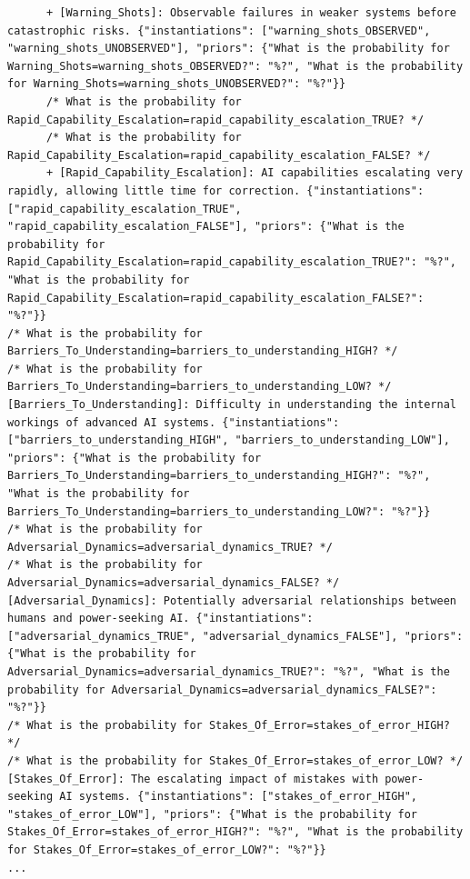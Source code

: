 \documentclass[
  11pt,
  letterpaper,
]{book}
\begin{document}
\begin{verbatim}
      + [Warning_Shots]: Observable failures in weaker systems before catastrophic risks. {"instantiations": ["warning_shots_OBSERVED", "warning_shots_UNOBSERVED"], "priors": {"What is the probability for Warning_Shots=warning_shots_OBSERVED?": "%?", "What is the probability for Warning_Shots=warning_shots_UNOBSERVED?": "%?"}}
      /* What is the probability for Rapid_Capability_Escalation=rapid_capability_escalation_TRUE? */
      /* What is the probability for Rapid_Capability_Escalation=rapid_capability_escalation_FALSE? */
      + [Rapid_Capability_Escalation]: AI capabilities escalating very rapidly, allowing little time for correction. {"instantiations": ["rapid_capability_escalation_TRUE", "rapid_capability_escalation_FALSE"], "priors": {"What is the probability for Rapid_Capability_Escalation=rapid_capability_escalation_TRUE?": "%?", "What is the probability for Rapid_Capability_Escalation=rapid_capability_escalation_FALSE?": "%?"}}
/* What is the probability for Barriers_To_Understanding=barriers_to_understanding_HIGH? */
/* What is the probability for Barriers_To_Understanding=barriers_to_understanding_LOW? */
[Barriers_To_Understanding]: Difficulty in understanding the internal workings of advanced AI systems. {"instantiations": ["barriers_to_understanding_HIGH", "barriers_to_understanding_LOW"], "priors": {"What is the probability for Barriers_To_Understanding=barriers_to_understanding_HIGH?": "%?", "What is the probability for Barriers_To_Understanding=barriers_to_understanding_LOW?": "%?"}}
/* What is the probability for Adversarial_Dynamics=adversarial_dynamics_TRUE? */
/* What is the probability for Adversarial_Dynamics=adversarial_dynamics_FALSE? */
[Adversarial_Dynamics]: Potentially adversarial relationships between humans and power-seeking AI. {"instantiations": ["adversarial_dynamics_TRUE", "adversarial_dynamics_FALSE"], "priors": {"What is the probability for Adversarial_Dynamics=adversarial_dynamics_TRUE?": "%?", "What is the probability for Adversarial_Dynamics=adversarial_dynamics_FALSE?": "%?"}}
/* What is the probability for Stakes_Of_Error=stakes_of_error_HIGH? */
/* What is the probability for Stakes_Of_Error=stakes_of_error_LOW? */
[Stakes_Of_Error]: The escalating impact of mistakes with power-seeking AI systems. {"instantiations": ["stakes_of_error_HIGH", "stakes_of_error_LOW"], "priors": {"What is the probability for Stakes_Of_Error=stakes_of_error_HIGH?": "%?", "What is the probability for Stakes_Of_Error=stakes_of_error_LOW?": "%?"}}
...
\end{verbatim}
\end{document}
